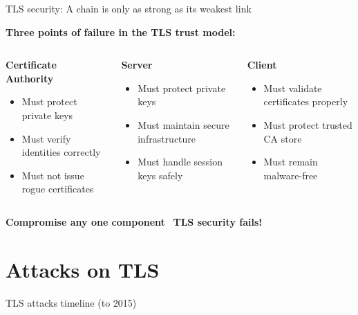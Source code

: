 \documentclass[aspectratio=169, lualatex, handout]{beamer}
\begin{document}
\begin{frame}{TLS security: A chain is only as strong as its weakest link}
	\begin{center}
		\textbf{Three points of failure in the TLS trust model:}
	\end{center}
	\begin{columns}[c]
		\begin{column}{0.33\textwidth}
			\textbf{Certificate Authority}
			\begin{itemize}
				\item Must protect private keys
				\item Must verify identities correctly
				\item Must not issue rogue certificates
			\end{itemize}
		\end{column}
		\begin{column}{0.33\textwidth}
			\textbf{Server}
			\begin{itemize}
				\item Must protect private keys
				\item Must maintain secure infrastructure
				\item Must handle session keys safely
			\end{itemize}
		\end{column}
		\begin{column}{0.33\textwidth}
			\textbf{Client}
			\begin{itemize}
				\item Must validate certificates properly
				\item Must protect trusted CA store
				\item Must remain malware-free
			\end{itemize}
		\end{column}
	\end{columns}
	\pause
	\begin{center}
		\textbf{Compromise any one component} \rightarrow\ \textbf{TLS security fails!}
	\end{center}
\end{frame}

\section{Attacks on TLS}

\begin{frame}{TLS attacks timeline (to 2015)}
\end{frame}
\end{document}
